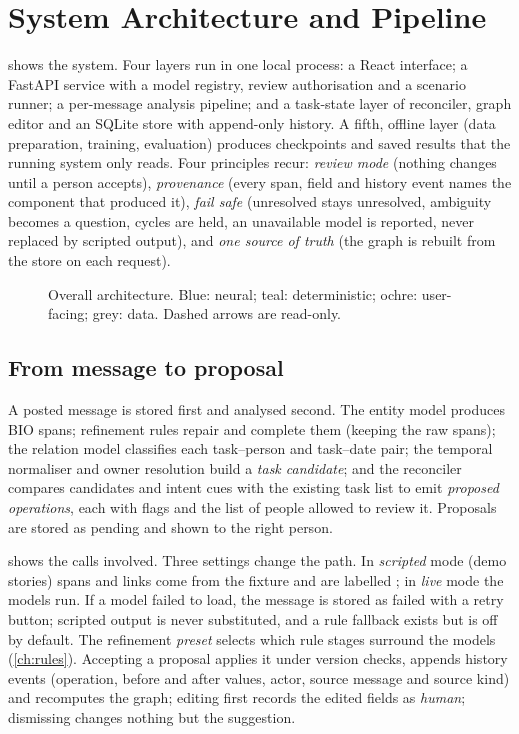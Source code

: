 \chapter{System Architecture and Pipeline}
\label{ch:architecture}

 shows the system. Four layers run in one local process: a React interface; a FastAPI service with a model registry, review authorisation and a scenario runner; a per-message analysis pipeline; and a task-state layer of reconciler, graph editor and an SQLite store with append-only history. A fifth, offline layer (data preparation, training, evaluation) produces checkpoints and saved results that the running system only reads. Four principles recur: \emph{review mode} (nothing changes until a person accepts), \emph{provenance} (every span, field and history event names the component that produced it), \emph{fail safe} (unresolved stays unresolved, ambiguity becomes a question, cycles are held, an unavailable model is reported, never replaced by scripted output), and \emph{one source of truth} (the graph is rebuilt from the store on each request).

\begin{figure}[htbp]
\centering
{}
\caption{Overall architecture. Blue: neural; teal: deterministic; ochre: user-facing; grey: data. Dashed arrows are read-only.}
\label{fig:architecture}
\end{figure}

\section{From message to proposal}
A posted message is stored first and analysed second. The entity model produces BIO spans; refinement rules repair and complete them (keeping the raw spans); the relation model classifies each task--person and task--date pair; the temporal normaliser and owner resolution build a \emph{task candidate}; and the reconciler compares candidates and intent cues with the existing task list to emit \emph{proposed operations}, each with flags and the list of people allowed to review it. Proposals are stored as pending and shown to the right person.


 shows the calls involved. Three settings change the path. In \emph{scripted} mode (demo stories) spans and links come from the fixture and are labelled ; in \emph{live} mode the models run. If a model failed to load, the message is stored as failed with a retry button; scripted output is never substituted, and a rule fallback exists but is off by default. The refinement \emph{preset} selects which rule stages surround the models (\cref{ch:rules}). Accepting a proposal applies it under version checks, appends history events (operation, before and after values, actor, source message and source kind) and recomputes the graph; editing first records the edited fields as \emph{human}; dismissing changes nothing but the suggestion.

